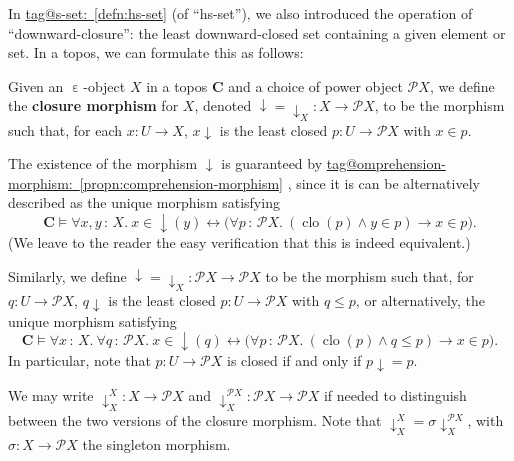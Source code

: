 \documentclass{amsart}
\makeatletter
\newcommand\bC{\mathbf{C}}
\newcommand\clo{\operatorname{clo}}
\newcommand\defword[1]{{\boldmath \textbf{#1}}}
\newcommand\dwnfn{{\downarrow}}
\newcommand\dwn{\mathpunct{\downarrow}}
\newcommand\ein{\mathrel{\varepsilon}}
\newcommand\pbig[1]{\big({#1}\big)}
\newcommand\pow{\mathcal{P}}
\newcommand\tolon{{\,:\,}}
\newcommand\tot{\leftrightarrow}
\newcommand\unein{{\ein}}
\newcommand\tagword[1]{\csname tag@#1\endcsname}
\def\label@tag#1:#2\@nil{#1}
\newcommand\labeltag[1]{\label@tag#1:\@nil}
\newcommand\jref[1]{%
  \texorpdfstring%
    {\hyperref[#1]{\tagword{\labeltag{#1}}~\ref*{#1}}}%
    {\tagword{\labeltag{#1}}~\ref*{#1}}%
}
\theoremstyle{definition}
\theoremstyle{remark}
\theoremstyle{plainwithref}
\makeatother
\begin{document}
In \jref{defn:hs-set} (of ``hs-set''), we also introduced the operation of ``downward-closure'': the least downward-closed set containing a given element or set.
In a topos, we can formulate this as follows:
\begin{defn} \label{defn:topos-dwn}
  Given an \( \unein \)-object \( X \) in a topos \( \bC \) and a choice of power object \( \pow X \), we define the \defword{closure morphism} for \( X \), denoted \( \dwnfn = \dwnfn_X \colon X \to \pow X \), to be the morphism such that, for each \( x \colon U \to X \), \( x \dwn \) is the least closed \( p \colon U \to \pow X \) with \( x \in p \).

  The existence of the morphism \( \dwnfn \) is guaranteed by \jref{propn:comprehension-morphism}, since it is can be alternatively described as the unique morphism satisfying
  \[
    \bC \vDash
    \forall x, y \tolon X.\ x \in \dwnfn(y) \tot
    \pbig{\forall p \tolon \pow X.\ (\clo(p) \wedge y \in p) \to x \in p}.
  \]
  (We leave to the reader the easy verification that this is indeed equivalent.)

  Similarly, we define \( \dwnfn = \dwnfn_X \colon \pow X \to \pow X \) to be the morphism such that, for \( q \colon U \to \pow X \), \( q \dwn \) is the least closed \( p \colon U \to \pow X \) with \( q \le p \), or alternatively, the unique morphism satisfying
  \[
    \bC \vDash
    \forall x \tolon X.\ \forall q \tolon \pow X.\ x \in \dwnfn(q) \tot
    \pbig{\forall p \tolon \pow X.\ (\clo(p) \wedge q \le p) \to x \in p}.
  \]
  In particular, note that \( p \colon U \to \pow X \) is closed if and only if \( p \dwn = p \).

  We may write \( \dwnfn_X^X \colon X \to \pow X \) and \( \dwnfn_X^{\pow X} \colon \pow X \to \pow X \) if needed to distinguish between the two versions of the closure morphism.
  Note that \( \dwnfn_X^X = \sigma \dwnfn_X^{\pow X} \), with \( \sigma \colon X \to \pow X \) the singleton morphism.


\end{defn}
\end{document}
